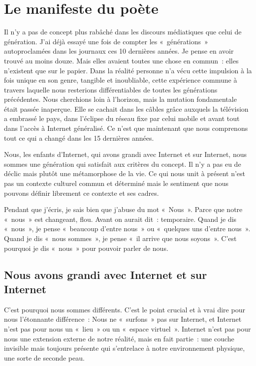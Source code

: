 \chapter{Le manifeste du poète}\label{poete}

Il n’y a pas de concept plus rabâché dans les discours médiatiques que celui de génération. J’ai déjà essayé une fois de compter les «~générations~» autoproclamées dans les journaux ces 10 dernières années. Je pense en avoir trouvé au moins douze. Mais elles avaient toutes une chose en commun~: elles n’existent que sur le papier. Dans la réalité personne n’a vécu
cette impulsion à la fois unique en son genre, tangible et inoubliable, cette expérience commune à travers laquelle nous resterions différentiables de toutes les générations précédentes. Nous
cherchions loin à l’horizon, mais la mutation fondamentale était passée inaperçue. Elle se cachait dans les câbles grâce auxquels la télévision a embrassé le pays, dans l’éclipse du réseau fixe par
celui mobile et avant tout dans l’accès à Internet généralisé. Ce n’est que maintenant que nous comprenons tout ce qui a changé dans les 15 dernières années.

Nous, les enfants d'Internet, qui avons grandi avec Internet et sur Internet, nous sommes une génération qui satisfait aux critères du concept. Il n’y a pas eu de déclic mais plutôt une
métamorphose de la vie. Ce qui nous unit à présent n’est pas un contexte culturel commun et déterminé mais le sentiment que nous pouvons définir librement ce contexte et ses cadres.

Pendant que j’écris, je sais bien que j’abuse du mot «~Nous~». Parce que notre «~nous~» est changeant, flou. Avant on aurait dit~: temporaire. Quand je dis «~nous~», je pense «~beaucoup d’entre nous~»
ou «~quelques uns d’entre nous~». Quand je dis «~nous sommes~», je pense «~il arrive que nous soyons~». C’est pourquoi je dis «~nous~» pour pouvoir parler de nous.

\section{Nous avons grandi avec Internet et sur Internet}
C’est pourquoi nous sommes différents. C’est le point crucial et à vrai dire pour nous l’étonnante différence~: Nous ne «~surfons~» pas sur Internet, et
Internet n’est pas pour nous un «~lieu~» ou un «~espace virtuel~». Internet n’est pas pour nous une extension externe de notre réalité, mais en fait partie~: une couche invisible mais toujours
présente qui s’entrelace à notre environnement physique, une sorte de seconde peau.

